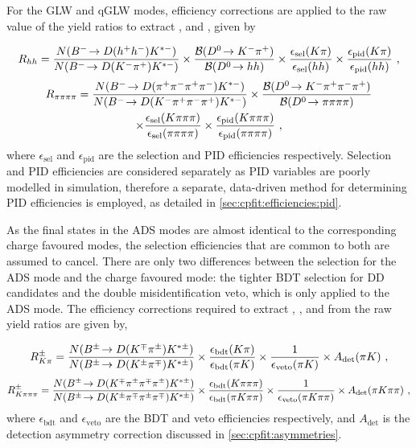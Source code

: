 For the GLW and qGLW modes, efficiency corrections are applied to the raw value of the yield ratios to extract \Rkk, \Rpipi and \Rpipipipi, given by 

{\footnotesize
\begin{equation}
R_{hh} = \frac{N({{{B}^-}}\!\rightarrow {\ensuremath{D}}(h^+h^-){{K}^{*-}})}{N({{{B}^-}}\!\rightarrow {\ensuremath{D}}({{K}^-}{{\pi}^+}){{K}^{*-}})} \times \frac{{\mathcal{B}}({{D}^0}\!\rightarrow {\ensuremath{{K}^-}}{\ensuremath{{\pi}^+}})}{{\mathcal{B}}({{D}^0}\!\rightarrow hh)} \times \frac{\epsilon_{\text{sel}}(K\pi)}{\epsilon_{\text{sel}}(hh)} \times \frac{\epsilon_{\text{pid}}(K\pi)}{\epsilon_{\text{pid}}(hh)} \text{ ,}
\label{effcorrectionglw2body}
\end{equation}
\begin{multline}
R_{\pi\pi\pi\pi} = \frac{N({{{B}^-}}\!\rightarrow {\ensuremath{D}}({{\pi}^+}{{\pi}^-}{{\pi}^+}{{\pi}^-}){{K}^{*-}})}{N({{{B}^-}}\!\rightarrow {\ensuremath{D}}({{K}^-}{{\pi}^+}{{\pi}^-}{{\pi}^+}){{K}^{*-}})} \times \frac{{\mathcal{B}}({{D}^0}\!\rightarrow {\ensuremath{{K}^-}}{\ensuremath{{\pi}^+}}{\ensuremath{{\pi}^-}}{\ensuremath{{\pi}^+}})}{{\mathcal{B}}({{D}^0}\!\rightarrow \pi\pi\pi\pi)} \\ \times \frac{\epsilon_{\text{sel}}(K\pi\pi\pi)}{\epsilon_{\text{sel}}(\pi\pi\pi\pi)} \times \frac{\epsilon_{\text{pid}}(K\pi\pi\pi)}{\epsilon_{\text{pid}}(\pi\pi\pi\pi)} \text{ ,}
\label{effcorrectionglw4body}
\end{multline}}%
where $\epsilon_{\text{sel}}$ and $\epsilon_{\text{pid}}$ are the selection and PID efficiencies respectively. Selection and PID efficiencies are considered separately as PID variables are poorly modelled in \lhcb simulation, therefore a separate, data-driven method for determining PID efficiencies is employed, as detailed in \sect\ref{sec:cpfit:efficiencies:pid}.

As the final states in the ADS modes are almost identical to the corresponding charge favoured modes, the selection efficiencies that are common to both are assumed to cancel. There are only two differences between the selection for the ADS mode and the charge favoured mode: the tighter BDT selection for DD candidates and the double misidentification veto, which is only applied to the ADS mode. The efficiency corrections required to extract \Rptwo, \Rmtwo, \Rpfour and \Rmfour from the raw yield ratios are given by, 

{\footnotesize
\begin{equation}
R^{\pm}_{K\pi} = \frac{N({{B}^\pm}\!\rightarrow {\ensuremath{D}}({{K}^\mp}{{\pi}^\pm}){{K}^{*\pm}})}{N({{B}^\pm}\!\rightarrow {\ensuremath{D}}({{K}^\pm}{{\pi}^\mp}){{K}^{*\pm}})} \times \frac{\epsilon_{\text{bdt}}(K\pi)}{\epsilon_{\text{bdt}}(\pi K)} \times \frac{1}{\epsilon_{\text{veto}}(\pi K)} \times A_{\text{det}}(\pi K) \text{ ,}
\label{effcorrectionads2body}
\end{equation}
\begin{equation}
R^{\pm}_{K\pi\pi\pi} = \frac{N({{B}^\pm}\!\rightarrow {\ensuremath{D}}({{K}^\mp}{{\pi}^\pm}{{\pi}^\mp}{{\pi}^\pm}){{K}^{*\pm}})}{N({{B}^\pm}\!\rightarrow {\ensuremath{D}}({{K}^\pm}{{\pi}^\mp}{{\pi}^\pm}{{\pi}^\mp}){{K}^{*\pm}})} \times \frac{\epsilon_{\text{bdt}}(K\pi\pi\pi)}{\epsilon_{\text{bdt}}(\pi K\pi\pi)} \times \frac{1}{\epsilon_{\text{veto}}(\pi K\pi\pi)} \times A_{\text{det}}(\pi K\pi\pi) \text{ ,}
\label{effcorrectionads4body}
\end{equation}}
where $\epsilon_{\text{bdt}}$ and $\epsilon_{\text{veto}}$ are the BDT and veto efficiencies respectively, and $A_{\text{det}}$ is the detection asymmetry correction discussed in \sect\ref{sec:cpfit:asymmetries}.

